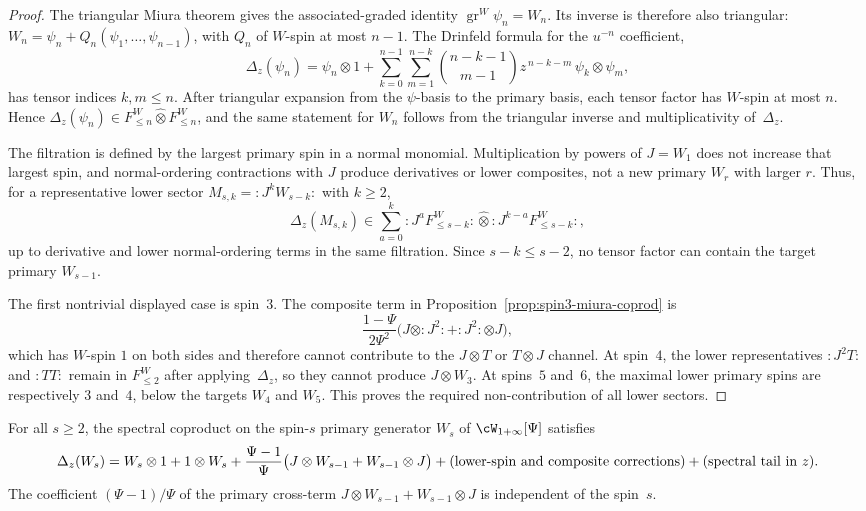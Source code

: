 \begin{proof}
The triangular Miura theorem gives the associated-graded
identity $\operatorname{gr}^{W}\psi_n=W_n$.  Its inverse is
therefore also triangular:
$W_n=\psi_n+Q_n(\psi_1,\ldots,\psi_{n-1})$, with
$Q_n$ of $W$-spin at most $n-1$.  The Drinfeld formula
for the $u^{-n}$ coefficient,
\[
 \Delta_z(\psi_n)
 =
 \psi_n\otimes1
 + \sum_{k=0}^{n-1}\sum_{m=1}^{n-k}
   \binom{n-k-1}{m-1}z^{\,n-k-m}\,
   \psi_k\otimes\psi_m,
\]
has tensor indices $k,m\leq n$.  After triangular expansion
from the $\psi$-basis to the primary basis, each tensor factor
has $W$-spin at most $n$.  Hence
$\Delta_z(\psi_n)\in
F^{W}_{\leq n}\widehat{\otimes}F^{W}_{\leq n}$, and the
same statement for $W_n$ follows from the triangular inverse
and multiplicativity of~$\Delta_z$.

The filtration is defined by the largest primary spin in a
normal monomial.  Multiplication by powers of
$J=W_1$ does not increase that largest spin, and normal-ordering
contractions with $J$ produce derivatives or lower composites,
not a new primary $W_r$ with larger $r$.  Thus, for a
representative lower sector
$M_{s,k}={:}J^kW_{s-k}{:}$ with $k\geq2$,
\[
 \Delta_z(M_{s,k})
 \in
 \sum_{a=0}^{k}
 {:}J^a F^{W}_{\leq s-k}{:}
 \widehat{\otimes}
 {:}J^{k-a}F^{W}_{\leq s-k}{:},
\]
up to derivative and lower normal-ordering terms in the same
filtration.  Since $s-k\leq s-2$, no tensor factor can contain
the target primary $W_{s-1}$.

The first nontrivial displayed case is spin~$3$.  The composite
term in Proposition~\ref{prop:spin3-miura-coprod} is
\[
 \frac{1-\Psi}{2\Psi^2}
 \bigl(J\otimes{:}J^2{:}+{:}J^2{:}\otimes J\bigr),
\]
which has $W$-spin $1$ on both sides and therefore cannot
contribute to the $J\otimes T$ or $T\otimes J$ channel.
At spin~$4$, the lower representatives
${:}J^2T{:}$ and ${:}TT{:}$ remain in
$F^{W}_{\leq2}$ after applying~$\Delta_z$, so they cannot
produce $J\otimes W_3$.  At spins~$5$ and~$6$, the maximal
lower primary spins are respectively $3$ and~$4$, below the
targets $W_4$ and $W_5$.  This proves the required
non-contribution of all lower sectors.
\end{proof}

\begin{theorem}
\label{thm:miura-cross-universality-monograph}
\ClaimStatusConditional
For all $s \geq 2$, the spectral coproduct on the
spin-$s$ primary generator $W_s$ of
$\cW_{1+\infty}[\Psi]$ satisfies
\begin{equation}\label{eq:miura-cross-universal}
 \Delta_z(W_s)
 = W_s \otimes 1 + 1 \otimes W_s
 + \frac{\Psi - 1}{\Psi}
 \bigl(J \otimes W_{s-1} + W_{s-1} \otimes J\bigr)
 + (\textup{lower-spin and composite corrections})
 + (\textup{spectral tail in~$z$}).
\end{equation}
The coefficient $(\Psi - 1)/\Psi$ of the primary
cross-term $J \otimes W_{s-1} + W_{s-1} \otimes J$
is independent of the spin~$s$.
\end{theorem}

